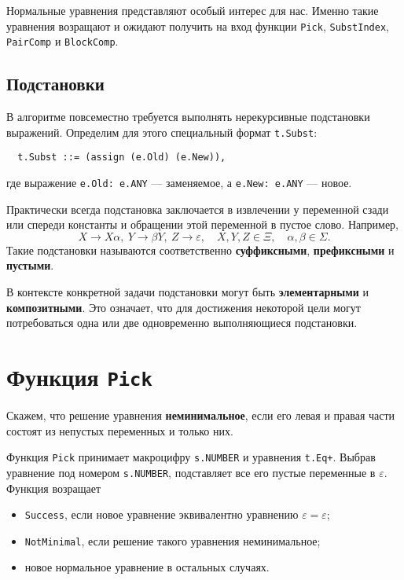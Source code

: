 \documentclass[12pt]{article}
\begin{document}
Нормальные уравнения представляют особый интерес для нас. Именно такие уравнения
возращают и ожидают получить на вход функции \texttt{Pick}, \texttt{SubstIndex},
\texttt{PairComp} и \texttt{BlockComp}.

\subsection{Подстановки}

В алгоритме повсеместно требуется выполнять нерекурсивные подстановки выражений.
Определим для этого специальный формат \texttt{t.Subst}:
\begin{Verbatim}
  t.Subst ::= (assign (e.Old) (e.New)),
\end{Verbatim}
где выражение \texttt{e.Old: e.ANY} --- заменяемое, а \texttt{e.New: e.ANY}
--- новое.

Практически всегда подстановка заключается в извлечении у переменной сзади или
спереди константы и обращении этой переменной в пустое слово. Например,
\begin{displaymath}
  X \to X \alpha, \ Y \to \beta Y, \ Z \to \varepsilon, \quad X, Y, Z \in \Xi,
  \quad \alpha, \beta \in \Sigma.
\end{displaymath}
Такие подстановки называются соответственно \textbf{суффиксными},
\textbf{префиксными} и \textbf{пустыми}.

В контексте конкретной задачи подстановки могут быть \textbf{элементарными} и
\textbf{композитными}. Это означает, что для достижения некоторой цели могут
потребоваться одна или две одновременно выполняющиеся подстановки.

\section{Функция \texttt{Pick}}

Скажем, что решение уравнения \textbf{неминимальное}, если его левая и правая
части состоят из непустых переменных и только них.

Функция \texttt{Pick} принимает макроцифру \texttt{s.NUMBER} и уравнения
\texttt{t.Eq+}. Выбрав уравнение под номером \texttt{s.NUMBER}, подставляет
все его пустые переменные в $\varepsilon$. Функция возращает
\begin{itemize}
  \item \texttt{Success}, если новое уравнение эквивалентно уравнению
  $\varepsilon = \varepsilon$;
\item \texttt{NotMinimal}, если решение такого уравнения неминимальное;
\item новое нормальное уравнение в остальных случаях.
\end{itemize}
\end{document}

